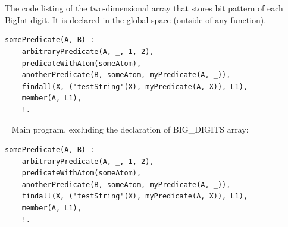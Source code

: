 \documentclass{article}
\begin{document}
\paragraph{}\
\paragraph{}\
\paragraph{}\
\paragraph{}\
\paragraph{}\
\paragraph{}\

	
	\noindent The code listing of the two-dimensional array that stores bit pattern of each BigInt digit. It is declared in the global space (outside of any function).
	
	\begin{verbatim}
somePredicate(A, B) :-
    arbitraryPredicate(A, _, 1, 2),
    predicateWithAtom(someAtom),
    anotherPredicate(B, someAtom, myPredicate(A, _)),
    findall(X, ('testString'(X), myPredicate(A, X)), L1),
    member(A, L1),
    !.
	\end{verbatim}
	
	\rmfamily\
	\newline
	\noindent Main program, excluding the declaration of BIG_DIGITS array:
	
	\begin{verbatim}
somePredicate(A, B) :-
    arbitraryPredicate(A, _, 1, 2),
    predicateWithAtom(someAtom),
    anotherPredicate(B, someAtom, myPredicate(A, _)),
    findall(X, ('testString'(X), myPredicate(A, X)), L1),
    member(A, L1),
    !.
	\end{verbatim}
	

	
\paragraph{}\
\paragraph{}\
\end{document}
